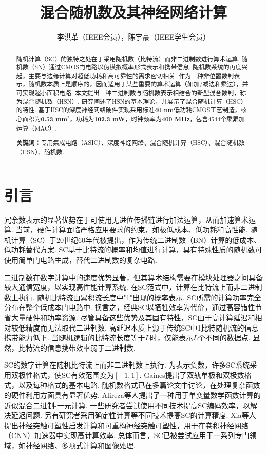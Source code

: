 \documentclass{solitairemiya-art}
\title{混合随机数及其神经网络计算}
\author{李洪革（IEEE会员），陈宇豪（IEEE学生会员）}
\begin{document}
\maketitle

\begin{abstract}
随机计算（SC）的独特之处在于采用随机数（比特流）而非二进制数进行算术运算. 随机数（SN）通过CMOS门电路以伪模拟概率形式表示和携带信息. 随机数系统的再度兴起，主要与边缘计算对超低功耗和高可靠性的需求密切相关. 作为一种非位置数制表示，随机数本质上是顺序的，因而适用于某些重要的算术运算（如加/减法和乘法），并可实现超小面积电路. 本文提出一种二进制数与随机数表示相结合的新型混合数制，称为混合随机数（HSN）. 研究阐述了HSN的基本理论，并展示了混合随机计算（HSC）的特性. 基于HSC的深度神经网络硬件实现采用标准\textbf{40-nm}低功耗CMOS工艺制造，核心面积为\textbf{0.53 mm$^2$}，功耗为\textbf{102.3 mW}，时钟频率为\textbf{400 MHz}，包含4544个乘累加运算（MAC）. 

\noindent\textbf{关键词：}\songti{}专用集成电路（ASIC）、深度神经网络、混合随机计算（HSC）、混合随机数（HSN）、随机数. 
\end{abstract}

\section{引言}

冗余数表示的显著优势在于可使用无进位传播链进行加法运算，从而加速算术运算\cite{ref1, ref2}. 当前，硬件计算面临严格应用要求的约束，如极低成本、低功耗和高性能. 随机计算（SC）于20世纪60年代被提出，作为传统二进制数（BN）计算的低成本、低功耗替代方案\cite{ref3, ref4}. SC基于比特流的概率和均值进行计算，具有特殊性质的随机数可使用简单门电路生成，替代二进制数的复杂电路\cite{ref5, ref6}. 

二进制数在数字计算中的速度优势显著，但其算术结构需要在模块处理器之间具备较大通信宽度，以实现高性能计算系统. 在SC范式中，计算在比特流上而非二进制数上执行. 随机比特流由累积流长度中"1"出现的概率表示\cite{ref3, ref4, ref5, ref6, ref7}. SC所需的计算功率完全分布在整个低成本门电路中. 换言之，经典SC以牺牲效率为代价，通过高容错性节省大量硬件和功率资源\cite{ref3, ref7, ref8}. 尽管具备这些优势及其固有特性，SC由于高计算延迟和相对较低精度而无法取代二进制数. 高延迟本质上源于传统SC中1比特随机流的信息携带能力低下. 当随机逻辑的比特流长度等于$L$时，仅能表示$L$个不同的数据点. 显然，比特流的信息携带效率弱于二进制数. 

SC的数字计算在随机比特流上而非二进制数上执行. 为表示负数，许多SC系统采用双极性格式，使SC有效范围变为$[-1, 1]$. Gaines\cite{ref8}提出了双轨单极和双极数格式，以及每种格式的基本电路. 随机数格式已在多篇论文中讨论，在处理复杂函数的硬件利用方面具有显著优势\cite{ref9, ref10, ref11}. Alireza等人\cite{ref12}提出了一种用于单变量数学函数计算的近似混合二进制-一元计算. 一些研究者尝试使用不同技术提高SC编码效率，以解决延迟问题\cite{ref13, ref14, ref15}. 另有研究者采用确定性计算等不同技术提高SC的计算精度\cite{ref16, ref17}. Xia等人\cite{ref18}提出神经突触可塑性启发计算和可重构神经突触可塑性，用于在卷积神经网络（CNN）加速器中实现高计算效率. 总体而言，SC已被尝试应用于一系列专门领域，如神经网络\cite{ref21, ref22, ref23}、多项式计算\cite{ref19, ref20}和图像处理\cite{ref12, ref24}. 
\end{document}

